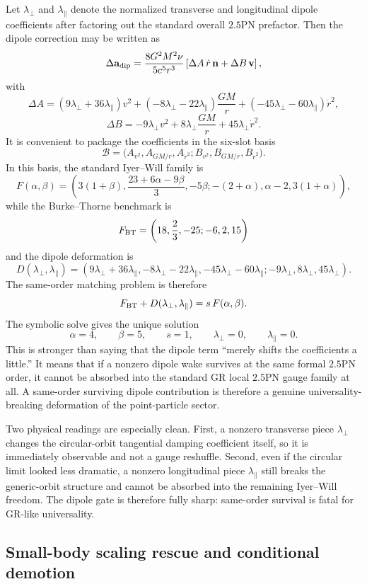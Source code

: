 \documentclass[11pt]{article}
\begin{document}
Let $\lambda_\perp$ and $\lambda_\parallel$ denote the normalized transverse and
longitudinal dipole coefficients after factoring out the standard overall
$2.5$PN prefactor.  Then the dipole correction may be written as
\[
\Delta\mathbf a_{\rm dip}
=
\frac{8G^2M^2\nu}{5c^5r^3}
\left[
\Delta A\,\dot r\,\mathbf n+\Delta B\,\mathbf v
\right],
\]
with
\[
\Delta A=
(9\lambda_\perp+36\lambda_\parallel)v^2
+(-8\lambda_\perp-22\lambda_\parallel)\frac{GM}{r}
+(-45\lambda_\perp-60\lambda_\parallel)\dot r^2,
\]
\[
\Delta B=
-9\lambda_\perp v^2
+8\lambda_\perp\frac{GM}{r}
+45\lambda_\perp\dot r^2.
\]
It is convenient to package the coefficients in the six-slot basis
\[
\mathcal B=\bigl(A_{v^2},A_{GM/r},A_{\dot r^2};B_{v^2},B_{GM/r},B_{\dot r^2}\bigr).
\]
In this basis, the standard Iyer--Will family is
\[
F(\alpha,\beta)=
\left(
3(1+\beta),
\frac{23+6\alpha-9\beta}{3},
-5\beta;
-(2+\alpha),
\alpha-2,
3(1+\alpha)
\right),
\]
while the Burke--Thorne benchmark is
\[
F_{\rm BT}=\left(18,\frac23,-25;-6,2,15\right)
\]
and the dipole deformation is
\[
D(\lambda_\perp,\lambda_\parallel)
=
\left(
9\lambda_\perp+36\lambda_\parallel,
-8\lambda_\perp-22\lambda_\parallel,
-45\lambda_\perp-60\lambda_\parallel;
-9\lambda_\perp,
8\lambda_\perp,
45\lambda_\perp
\right).
\]
The same-order matching problem is therefore
\[
F_{\rm BT}+D(\lambda_\perp,\lambda_\parallel)=s\,F(\alpha,\beta).
\]
The symbolic solve gives the unique solution
\[
\boxed{
\alpha=4,
\qquad
\beta=5,
\qquad
s=1,
\qquad
\lambda_\perp=0,
\qquad
\lambda_\parallel=0.
}
\]
This is stronger than saying that the dipole term ``merely shifts the
coefficients a little.''  It means that if a nonzero dipole wake survives at the
same formal $2.5$PN order, it cannot be absorbed into the standard GR local
$2.5$PN gauge family at all.  A same-order surviving dipole contribution is
therefore a genuine universality-breaking deformation of the point-particle
sector.

Two physical readings are especially clean.  First, a nonzero transverse piece
$\lambda_\perp$ changes the circular-orbit tangential damping coefficient itself,
so it is immediately observable and not a gauge reshuffle.  Second, even if the
circular limit looked less dramatic, a nonzero longitudinal piece
$\lambda_\parallel$ still breaks the generic-orbit structure and cannot be
absorbed into the remaining Iyer--Will freedom.  The dipole gate is therefore
fully sharp: same-order survival is fatal for GR-like universality.

\subsection{Small-body scaling rescue and conditional demotion}
\label{app:dipole-ledger-scaling}
\end{document}
